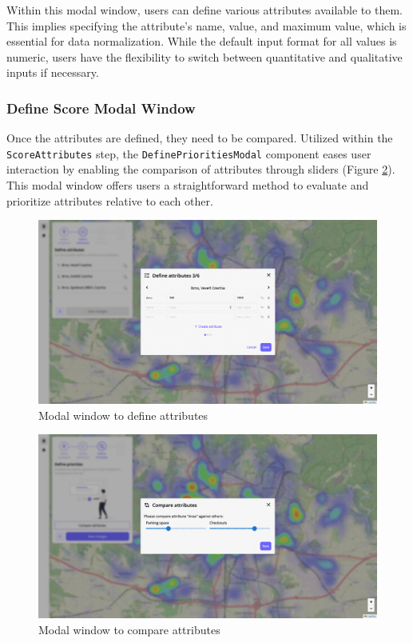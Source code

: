 Within this modal window, users can define various attributes available to them. This implies specifying the attribute's name, value, and maximum value, which is essential for data normalization. While the default input format for all values is numeric, users have the flexibility to switch between quantitative and qualitative inputs if necessary.

\subsubsection{Define Score Modal Window}

Once the attributes are defined, they need to be compared. Utilized within the\\ \texttt{ScoreAttributes} step, the \texttt{DefinePrioritiesModal} component eases user interaction by enabling the comparison of attributes through sliders (Figure \ref{fig:uiModalDefineScore}). This modal window offers users a straightforward method to evaluate and prioritize attributes relative to each other.

\begin{figure}[ht]\centering
  \centering
  \includegraphics[width=0.8\linewidth]{obrazky-figures/ch6/attribute.png}
  \caption{Modal window to define attributes}
  \label{fig:uiModalDefineAttributes}
\end{figure}

\begin{figure}[ht]\centering
  \centering
  \includegraphics[width=0.8\linewidth]{obrazky-figures/ch6/compare.png}
  \caption{Modal window to compare attributes}
  \label{fig:uiModalDefineScore}
\end{figure}

